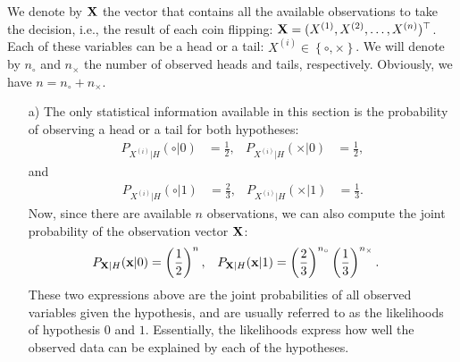 \begin{solution}
	
	We denote by $\bf X$ the vector that  contains all the available observations to take the decision, i.e., the result of each coin flipping: ${\bf X} = (X^{(1)}, X^{(2)}, \ldots, X^{(n)})^\top$. Each of these variables can be a head or a tail: $X^{(i)} \in \left\{\circ,\times \right\}$. We will denote by $n_\circ$ and $n_\times$ the number of observed heads and tails, respectively. Obviously, we have $n = n_\circ + n_\times$.
	
	\begin{itemize}
		\item [a)] The only statistical information available in this section is the probability of observing a head or a tail for both hypotheses:
		\begin{align*}
		P_{X^{(i)}|H}(\circ | 0) &= \frac{1}{2}, & P_{X^{(i)}|H}(\times | 0) &= \frac{1}{2},
		\end{align*}
		and
		\begin{align*}
		P_{X^{(i)}|H}(\circ | 1) &= \frac{2}{3}, & P_{X^{(i)}|H}(\times | 1) &= \frac{1}{3}.
		\end{align*}
		Now, since there are available $n$ observations, we can also compute the joint probability of the observation vector $\bf X$:
		\begin{align*}
		P_{{\bf X}|H}({\bf x}|0) &= \left( \frac{1}{2}\right)^{n}, & P_{{\bf X}|H}({\bf x}|1) &= \left( \frac{2}{3}\right)^{n_\circ} \left( \frac{1}{3}\right)^{n_\times}.
		\end{align*}		
		These two expressions above are the joint probabilities of all observed variables given the hypothesis, and are usually referred to as the likelihoods of hypothesis $0$ and $1$. Essentially, the likelihoods express how well the observed data can be explained by each of the hypotheses.
		

\end{itemize}
\end{solution}
